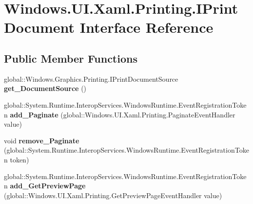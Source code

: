 \hypertarget{interface_windows_1_1_u_i_1_1_xaml_1_1_printing_1_1_i_print_document}{}\section{Windows.\+U\+I.\+Xaml.\+Printing.\+I\+Print\+Document Interface Reference}
\label{interface_windows_1_1_u_i_1_1_xaml_1_1_printing_1_1_i_print_document}
\subsection*{Public Member Functions}
\begin{DoxyCompactItemize}
\item 
\mbox{\label{interface_windows_1_1_u_i_1_1_xaml_1_1_printing_1_1_i_print_document_a42077e57d55ca55665d043d48da3ec8a}} 
global\+::\+Windows.\+Graphics.\+Printing.\+I\+Print\+Document\+Source {\bfseries get\+\_\+\+Document\+Source} ()
\item 
\mbox{\label{interface_windows_1_1_u_i_1_1_xaml_1_1_printing_1_1_i_print_document_a9dbc873132dc18654e2b7e972080c41e}} 
global\+::\+System.\+Runtime.\+Interop\+Services.\+Windows\+Runtime.\+Event\+Registration\+Token {\bfseries add\+\_\+\+Paginate} (global\+::\+Windows.\+U\+I.\+Xaml.\+Printing.\+Paginate\+Event\+Handler value)
\item 
\mbox{\label{interface_windows_1_1_u_i_1_1_xaml_1_1_printing_1_1_i_print_document_a799ea5a2c39144ec765078426a3efac8}} 
void {\bfseries remove\+\_\+\+Paginate} (global\+::\+System.\+Runtime.\+Interop\+Services.\+Windows\+Runtime.\+Event\+Registration\+Token token)
\item 
\mbox{\label{interface_windows_1_1_u_i_1_1_xaml_1_1_printing_1_1_i_print_document_acb9d671a3b4a58e885771c4ec6c329d5}} 
global\+::\+System.\+Runtime.\+Interop\+Services.\+Windows\+Runtime.\+Event\+Registration\+Token {\bfseries add\+\_\+\+Get\+Preview\+Page} (global\+::\+Windows.\+U\+I.\+Xaml.\+Printing.\+Get\+Preview\+Page\+Event\+Handler value)

\end{DoxyCompactItemize}

